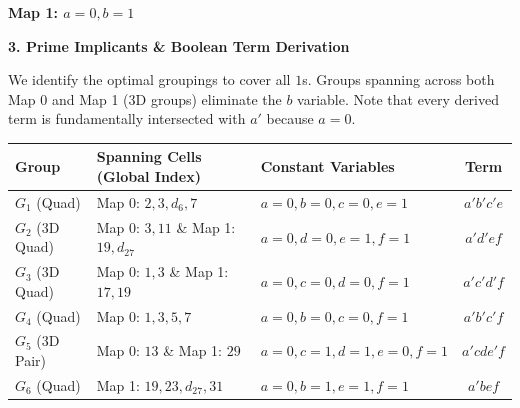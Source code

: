 \documentclass[12pt,a3paper]{article}
\begin{document}
\begin{enumerate}
\begin{tcolorbox}[enhanced,breakable,ansbox,colback=cC!4,colframe=cC,boxrule=0.8pt,arc=5pt,title={\textbf{Answer}},fonttitle=\bfseries\color{white},colbacktitle=cC]
\begin{center}
\begin{minipage}{0.45\textwidth}
\begin{karnaugh-map}[4][4][1][$ef$][$cd$]
\end{karnaugh-map}
\end{minipage}
\hfill
\begin{minipage}{0.45\textwidth}
\centering
\textbf{Map 1: $a=0, b=1$} \\
\vspace{0.5em}
\begin{karnaugh-map}[4][4][1][$ef$][$cd$]
    \autoterms[0]
    
\end{karnaugh-map}
\end{minipage}
\end{center}

\vspace{1em}
\textbf{3. Prime Implicants \& Boolean Term Derivation}

We identify the optimal groupings to cover all $1$s. Groups spanning across both Map 0 and Map 1 (3D groups) eliminate the $b$ variable. Note that every derived term is fundamentally intersected with $a'$ because $a=0$.

\begin{center}
\renewcommand{\arraystretch}{1.3}
\begin{tabular}{@{}lllc@{}}
\toprule
\textbf{Group} & \textbf{Spanning Cells (Global Index)} & \textbf{Constant Variables} & \textbf{Term} \\
\midrule
$G_1$ (Quad) & Map 0: $2, 3, d_6, 7$ & $a=0, b=0, c=0, e=1$ & $a'b'c'e$ \\
$G_2$ (3D Quad) & Map 0: $3, 11$ \& Map 1: $19, d_{27}$ & $a=0, d=0, e=1, f=1$ & $a'd'ef$ \\
$G_3$ (3D Quad) & Map 0: $1, 3$ \& Map 1: $17, 19$ & $a=0, c=0, d=0, f=1$ & $a'c'd'f$ \\
$G_4$ (Quad) & Map 0: $1, 3, 5, 7$ & $a=0, b=0, c=0, f=1$ & $a'b'c'f$ \\
$G_5$ (3D Pair) & Map 0: $13$ \& Map 1: $29$ & $a=0, c=1, d=1, e=0, f=1$ & $a'cde'f$ \\
$G_6$ (Quad) & Map 1: $19, 23, d_{27}, 31$ & $a=0, b=1, e=1, f=1$ & $a'bef$ \\
\bottomrule
\end{tabular}
\end{center}



\end{tcolorbox}
\end{enumerate}
\end{document}
